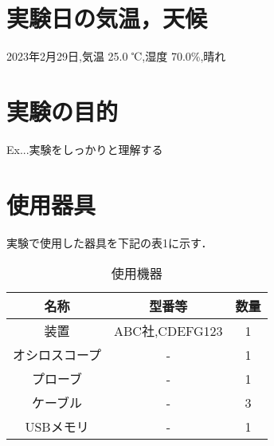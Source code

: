 \section{実験日の気温，天候}
2023年2月29日,気温 25.0 ℃,湿度 70.0\%,晴れ

\section{実験の目的}
Ex...実験をしっかりと理解する
\section{使用器具}
実験で使用した器具を下記の表1に示す．
\begin{table}[htbp]
  \begin{center}
    \caption{使用機器}
    \begin{tabular}{|c|c|c|} \hline
      名称 & 型番等 & 数量 \\ \hline
      装置 & ABC社,CDEFG123 & 1 \\ \hline
      オシロスコープ & - & 1 \\ \hline
      プローブ & - & 1 \\ \hline
      ケーブル & - & 3 \\ \hline
      USBメモリ & - & 1 \\ \hline

    \end{tabular}
  \end{center}
\end{table}